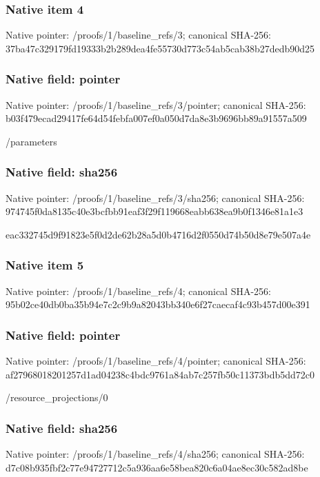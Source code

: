 \documentclass[10pt,a4paper]{article}
\begin{document}
\subsubsection{Native item 4}
Native pointer: /proofs/1/baseline\_\allowbreak{}refs/3; canonical SHA-256: 37ba47c329179fd19333b2b289dea4fe55730d773c54ab5cab38b27dedb90d25

\subsubsection{Native field: pointer}
Native pointer: /proofs/1/baseline\_\allowbreak{}refs/3/pointer; canonical SHA-256: b03f479ecad29417fe64d54febfa007ef0a050d7da8e3b9696bb89a91557a509

\begingroup\raggedright\sloppy /\allowbreak{}parameters\par\endgroup

\subsubsection{Native field: sha256}
Native pointer: /proofs/1/baseline\_\allowbreak{}refs/3/sha256; canonical SHA-256: 974745f0da8135c40e3bcfbb91eaf3f29f119668eabb638ea9b0f1346e81a1e3

\begingroup\raggedright\sloppy eac332745d9f91823e5f0d2de62b28a5d0b4716d2f0550d74b50d8e79e507a4e\par\endgroup

\subsubsection{Native item 5}
Native pointer: /proofs/1/baseline\_\allowbreak{}refs/4; canonical SHA-256: 95b02ce40db0ba35b94e7c2c9b9a82043bb340e6f27caecaf4c93b457d00e391

\subsubsection{Native field: pointer}
Native pointer: /proofs/1/baseline\_\allowbreak{}refs/4/pointer; canonical SHA-256: af27968018201257d1ad04238c4bdc9761a84ab7c257fb50c11373bdb5dd72c0

\begingroup\raggedright\sloppy /\allowbreak{}resource\_\allowbreak{}projections/\allowbreak{}0\par\endgroup

\subsubsection{Native field: sha256}
Native pointer: /proofs/1/baseline\_\allowbreak{}refs/4/sha256; canonical SHA-256: d7c08b935fbf2c77e94727712c5a936aa6e58bea820c6a04ae8ec30c582ad8be
\end{document}
